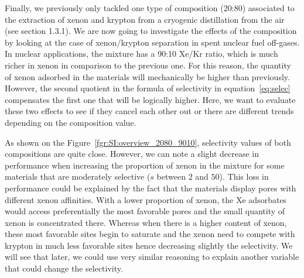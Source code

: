 \documentclass[main.tex]{subfiles}
\begin{document}
Finally, we previously only tackled one type of composition (20:80) associated to the extraction of xenon and krypton from a cryogenic distillation from the air (see section 1.3.1). We are now going to investigate the effects of the composition by looking at the case of xenon/krypton separation in spent nuclear fuel off-gases. In nuclear applications, the mixture has a 90:10 Xe/Kr ratio, which is much richer in xenon in comparison to the previous one. For this reason, the quantity of xenon adsorbed in the materials will mechanically be higher than previously. However, the second quotient in the formula of selectivity in equation~\ref{eq:selec} compensates the first one that will be logically higher. Here, we want to evaluate these two effects to see if they cancel each other out or there are different trends depending on the composition value. 

As shown on the Figure~\ref{fgr:SI:overview_2080_9010}, selectivity values of both compositions are quite close. However, we can note a slight decrease in performance when increasing the proportion of xenon in the mixture for some materials that are moderately selective ($s$ between $2$ and $50$). This loss in performance could be explained by the fact that the materials display pores with different xenon affinities. With a lower proportion of xenon, the Xe adsorbates would access preferentially the most favorable pores and the small quantity of xenon is concentrated there. Whereas when there is a higher content of xenon, these most favorable sites begin to saturate and the xenon need to compete with krypton in much less favorable sites hence decreasing slightly the selectivity. We will see that later, we could use very similar reasoning to explain another variable that could change the selectivity.
\end{document}
